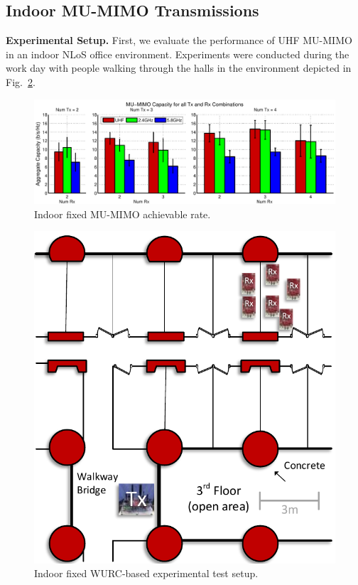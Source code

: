 \subsection{Indoor MU-MIMO Transmissions}
\label{sec_static_indoor_exp}

\label{sec:indoor}
\textbf{Experimental Setup.}
First, we evaluate the performance of UHF \ac{MU-MIMO} in an indoor \ac{NLoS}  office environment.
Experiments were conducted during the work day with people walking through the halls in the environment depicted in Fig.~\ref{fig:indoorExp}.


\begin{figure}[t!]
	\centering
  	\includegraphics[width=1\linewidth]{figs/indoor_wl_all}   
    	\caption{Indoor fixed MU-MIMO achievable rate.\label{fig:indoor_cap_all}}
\end{figure}


\begin{figure}[th]
\vspace{-5mm}
	\centering
  	\includegraphics[width=0.7\linewidth]{figs/indoorExp}   
    	\caption{Indoor fixed WURC-based experimental test setup.
	\label{fig:indoorExp}}
\end{figure}



